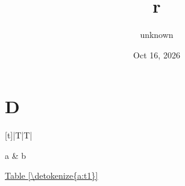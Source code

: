 \documentclass[letterpaper,10pt,english]{sphinxmanual}
\title{r}
\date{Oct 16, 2026}
\author{unknown}
\begin{document}
\pagestyle{empty}
\sphinxmaketitle
\pagestyle{plain}
\sphinxtableofcontents
\pagestyle{normal}
\label{\detokenize{index::doc}}



\chapter{D}
\label{\detokenize{a:d}}\label{\detokenize{a::doc}}

\begin{savenotes}\sphinxattablestart
\centering
{}
\sphinxthecaptionisattop
{}\label{\detokenize{a:t1}}
\sphinxaftertopcaption
\begin{tabulary}{\linewidth}[t]{|T|T|}
\hline

a
&
b
\\
\hline
\end{tabulary}
\par
\sphinxattableend\end{savenotes}

\hyperref[\detokenize{a:t1}]{Table \ref{\detokenize{a:t1}}}



\renewcommand{\indexname}{Index}
\printindex
\end{document}
